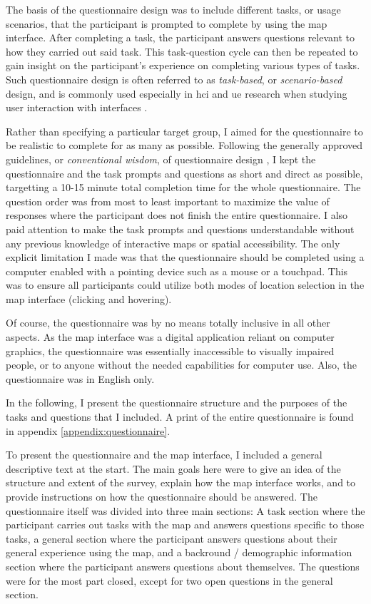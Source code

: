 The basis of the questionnaire design was to include
different tasks, or usage scenarios,
that the participant is prompted to complete by using the map interface.
After completing a task,
the participant answers questions relevant to how they carried out said task.
This task-question cycle can then be repeated to gain insight on the participant's
experience on completing various types of tasks.
Such questionnaire design is often referred to as \textit{task-based},
or \textit{scenario-based} design,
and is commonly used especially in \acrshort{hci} and \acrshort{ue} research
when studying user interaction with interfaces \parencite{ada2008, lew1991}.

Rather than specifying a particular target group,
I aimed for the questionnaire to be realistic to complete for as many as possible.
Following the generally approved guidelines,
or \textit{conventional wisdom}, of questionnaire design \parencite{kro2018},
I kept the questionnaire and the task prompts and questions as short and direct as possible,
targetting a 10-15 minute total completion time for the whole questionnaire.
The question order was from most to least important to maximize
the value of responses where the participant does not finish the entire questionnaire.
I also paid attention to make the task prompts and questions
understandable without any previous knowledge of interactive maps or spatial accessibility.
The only explicit limitation I made was that the questionnaire should be completed
using a computer enabled with a pointing device such as a mouse or a touchpad.
This was to ensure all participants could utilize both modes of location selection in the map interface
(clicking and hovering).

Of course, the questionnaire was by no means totally inclusive in all other aspects.
As the map interface was a digital application reliant on computer graphics,
the questionnaire was essentially inaccessible to visually impaired people,
or to anyone without the needed capabilities for computer use.
Also, the questionnaire was in English only.

In the following, I present the questionnaire structure
and the purposes of the tasks and questions that I included.
A print of the entire questionnaire is found in appendix \ref{appendix:questionnaire}.

To present the questionnaire and the map interface,
I included a general descriptive text at the start.
The main goals here were to give an idea of the structure and extent of the survey,
explain how the map interface works,
and to provide instructions on how the questionnaire should be answered.
The questionnaire itself was divided into three main sections:
A task section where the participant carries out tasks with the map
and answers questions specific to those tasks,
a general section where the participant answers questions about
their general experience using the map,
and a backround / demographic information section
where the participant answers questions about themselves.
The questions were for the most part closed,
except for two open questions in the general section.

